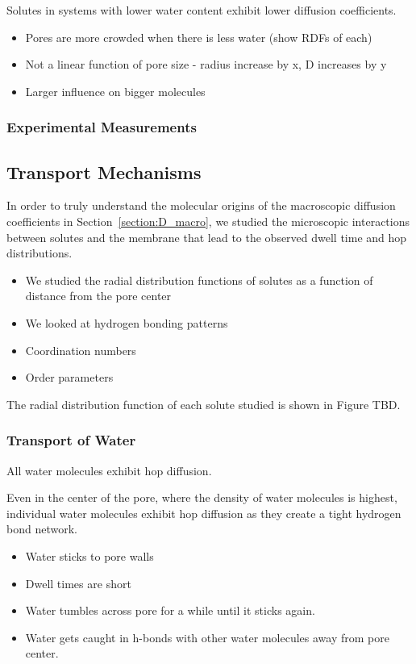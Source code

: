 \documentclass{article}
\begin{document}
  Solutes in systems with lower water content exhibit lower diffusion coefficients.
  \begin{itemize}
	\item Pores are more crowded when there is less water (show RDFs of each)
	\item Not a linear function of pore size - radius increase by x, D increases by y
	\item Larger influence on bigger molecules
  \end{itemize}

  \subsubsection{Experimental Measurements}


  \subsection{Transport Mechanisms}

  In order to truly understand the molecular origins of the macroscopic
  diffusion coefficients in Section~\ref{section:D_macro}, we studied the
  microscopic interactions between solutes and the membrane that lead to the
  observed dwell time and hop distributions.
  \begin{itemize}
	\item We studied the radial distribution functions of solutes as a
	function of distance from the pore center
	\item We looked at hydrogen bonding patterns
	\item Coordination numbers
	\item Order parameters
  \end{itemize}

  The radial distribution function of each solute studied is shown in 
  Figure TBD.

  \subsubsection*{Transport of Water}

  All water molecules exhibit hop diffusion.

  Even in the center of the pore, where the density of water molecules is
  highest, individual water molecules exhibit hop diffusion as they create a
  tight hydrogen bond network.
  \begin{itemize}
	\item Water sticks to pore walls
	\item Dwell times are short
	\item Water tumbles across pore for a while until it sticks again. 
	\item Water gets caught in h-bonds with other water molecules away
	from pore center.
  \end{itemize}
\end{document}
